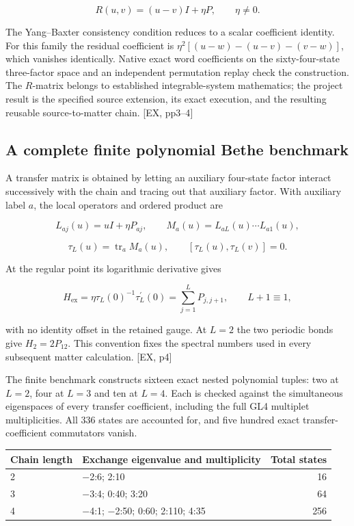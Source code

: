 \[
R(u,v)=(u-v)I+\eta P,\qquad\eta\ne0.
\]

The Yang--Baxter consistency condition reduces to a scalar coefficient identity. For this family the residual coefficient is \(\eta^2[(u-w)-(u-v)-(v-w)]\), which vanishes identically. Native exact word coefficients on the sixty-four-state three-factor space and an independent permutation replay check the construction. The \(R\)-matrix belongs to established integrable-system mathematics; the project result is the specified source extension, its exact execution, and the resulting reusable source-to-matter chain. {[}EX, pp3--4{]}

\subsection{A complete finite polynomial Bethe benchmark}\label{a-complete-finite-polynomial-bethe-benchmark}

A transfer matrix is obtained by letting an auxiliary four-state factor interact successively with the chain and tracing out that auxiliary factor. With auxiliary label \(a\), the local operators and ordered product are

\[
L_{aj}(u)=uI+\eta P_{aj},\qquad M_a(u)=L_{aL}(u)\cdots L_{a1}(u),
\]

\[
\tau_L(u)=\operatorname{tr}_a M_a(u),\qquad[\tau_L(u),\tau_L(v)]=0.
\]

At the regular point its logarithmic derivative gives

\[
H_{\mathrm{ex}}=\eta\tau_L(0)^{-1}\tau_L^{\prime}(0)=\sum_{j=1}^{L}P_{j,j+1},\qquad L+1\equiv1,
\]

with no identity offset in the retained gauge. At \(L=2\) the two periodic bonds give \(H_2=2P_{12}\). This convention fixes the spectral numbers used in every subsequent matter calculation. {[}EX, p4{]}

The finite benchmark constructs sixteen exact nested polynomial tuples: two at \(L=2\), four at \(L=3\) and ten at \(L=4\). Each is checked against the simultaneous eigenspaces of every transfer coefficient, including the full GL4 multiplet multiplicities. All 336 states are accounted for, and five hundred exact transfer-coefficient commutators vanish.

\begin{table}[htbp]\centering\scriptsize
\begin{tabular}{@{}llr@{}}
\toprule
Chain length & Exchange eigenvalue and multiplicity & Total states \\
\midrule
2 & −2:6; 2:10 & 16 \\
3 & −3:4; 0:40; 3:20 & 64 \\
4 & −4:1; −2:50; 0:60; 2:110; 4:35 & 256 \\
\bottomrule
\end{tabular}
\end{table}

